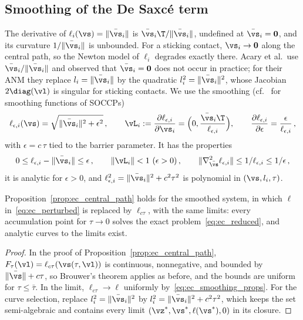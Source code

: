 \subsection{Smoothing of the De Saxc\'e term}\label{sec:ec_smoothing}
%
The derivative of $\ell_i(\vs) = \|\bar{\vs}_i\|$ is $\bar{\vs}_i\T/\|\bar{\vs}_i\|$, undefined at $\bar{\vs}_i = \mathbf{0}$, and its curvature $1/\|\bar{\vs}_i\|$ is unbounded. For a sticking contact, $\vs_i \to \mathbf{0}$ along the central path, so the Newton model of $\ell_i$ degrades exactly there. Acary et al.\ use $\bar{\vs}_i/\|\bar{\vs}_i\|$ and observed that $\bar{\vs}_i = \mathbf{0}$ does not occur in practice; for their ANM they replace $l_i = \|\bar{\vs}_i\|$ by the quadratic $l_i^2 = \|\bar{\vs}_i\|^2$, whose Jacobian $2\diag(\vl)$ is singular for sticking contacts. We use the smoothing (cf.~\cite{Fukushima2002} for smoothing functions of SOCCPs)
%
\begin{equation}\label{eq:ec_smoothing}
	\ell_{\epsilon,i}(\vs) = \sqrt{\|\bar{\vs}_i\|^2 + \epsilon^2} \, , \qquad
	\vL_i := \frac{\partial \ell_{\epsilon,i}}{\partial \vs_i} = \Big(0, \frac{\bar{\vs}_i\T}{\ell_{\epsilon,i}}\Big) , \qquad
	\frac{\partial \ell_{\epsilon,i}}{\partial \epsilon} = \frac{\epsilon}{\ell_{\epsilon,i}} \, ,
\end{equation}
%
with $\epsilon = c\,\tau$ tied to the barrier parameter. It has the properties
%
\begin{equation}\label{eq:ec_smoothing_props}
	0 \leq \ell_{\epsilon,i} - \|\bar{\vs}_i\| \leq \epsilon \, , \qquad \|\vL_i\| < 1 \ (\epsilon > 0) \, , \qquad \|\nabla^2_{\bar{\vs}}\ell_{\epsilon,i}\| \leq 1/\ell_{\epsilon,i} \leq 1/\epsilon \, ,
\end{equation}
%
it is analytic for $\epsilon > 0$, and $\ell_{\epsilon,i}^2 = \|\bar{\vs}_i\|^2 + c^2\tau^2$ is polynomial in $(\vs, l_i, \tau)$.
%
\begin{proposition}\label{prop:ec_smoothed_path}
	Proposition~\ref{prop:ec_central_path} holds for the smoothed system, in which $\ell$ in~\eqref{eq:ec_perturbed} is replaced by $\ell_{c\tau}$, with the same limits: every accumulation point for $\tau \to 0$ solves the exact problem~\eqref{eq:ec_reduced}, and analytic curves to the limits exist.
\end{proposition}
%
\begin{proof}
	In the proof of Proposition~\ref{prop:ec_central_path}, $F_{\tau}(\vl) = \ell_{c\tau}(\vs(\tau, \vl))$ is continuous, nonnegative, and bounded by $\|\bar{\vs}\| + c\tau$, so Brouwer's theorem applies as before, and the bounds are uniform for $\tau \leq \bar{\tau}$. In the limit, $\ell_{c\tau} \to \ell$ uniformly by~\eqref{eq:ec_smoothing_props}. For the curve selection, replace $l_i^2 = \|\bar{\vs}_i\|^2$ by $l_i^2 = \|\bar{\vs}_i\|^2 + c^2\tau^2$, which keeps the set semi-algebraic and contains every limit $(\vz^*, \vs^*, \ell(\vs^*), 0)$ in its closure.
\end{proof}
